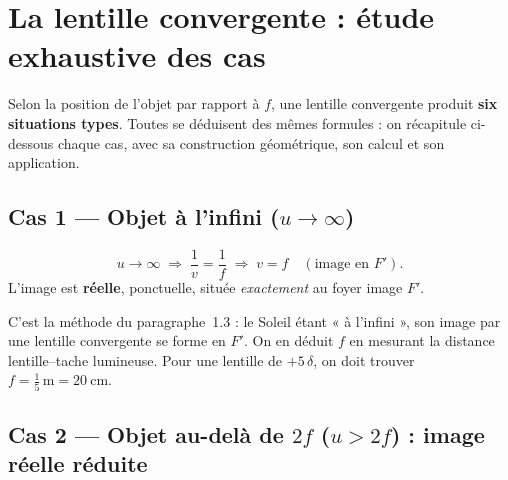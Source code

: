 \documentclass[11pt,a4paper]{article}
\newcommand{\LentilleConv}[2]{%
  \draw[verrecol,line width=1.8pt,<->,>=Stealth] (#1,-#2)--(#1,#2);}
\begin{document}
\section{La lentille convergente : étude exhaustive des cas}
Selon la position de l'objet par rapport à $f$, une lentille convergente produit \textbf{six
situations types}. Toutes se déduisent des mêmes formules : on récapitule ci-dessous chaque cas,
avec sa construction géométrique, son calcul et son application.

\subsection{Cas 1 — Objet à l'infini ($u\to\infty$)}

\begin{center}
\end{center}

\begin{formule}
\[ u\to\infty \;\Longrightarrow\; \frac{1}{v}=\frac{1}{f} \;\Longrightarrow\; \boxed{v=f}\quad(\text{image en }F'). \]
L'image est \textbf{réelle}, ponctuelle, située \emph{exactement} au foyer image $F'$.
\end{formule}

\begin{exemple}
C'est la méthode du paragraphe~1.3 : le Soleil étant « à l'infini », son image par une lentille
convergente se forme en $F'$. On en déduit $f$ en mesurant la distance lentille--tache lumineuse.
Pour une lentille de $+5\,\delta$, on doit trouver $f=\tfrac{1}{5}\,\si{\metre}=\SI{20}{\centi\metre}$.
\end{exemple}

\subsection{Cas 2 — Objet au-delà de $2f$ ($u>2f$) : image réelle réduite}
\end{document}
